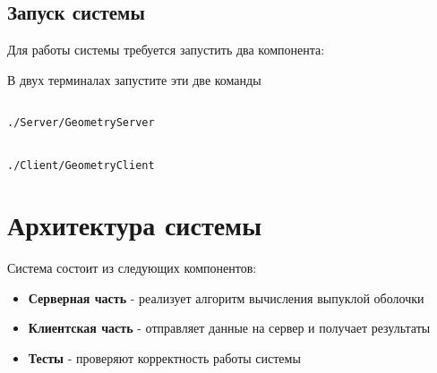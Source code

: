 \documentclass{article}
\begin{document}
\subsection{Запуск системы}
Для работы системы требуется запустить два компонента:

В двух терминалах запустите эти две команды
\begin{lstlisting}[language=bash]

./Server/GeometryServer


./Client/GeometryClient
\end{lstlisting}

\section{Архитектура системы}
Система состоит из следующих компонентов:

\begin{itemize}
    \item \textbf{Серверная часть} - реализует алгоритм вычисления выпуклой оболочки
    \item \textbf{Клиентская часть} - отправляет данные на сервер и получает результаты
    \item \textbf{Тесты} - проверяют корректность работы системы
\end{itemize}
\end{document}
